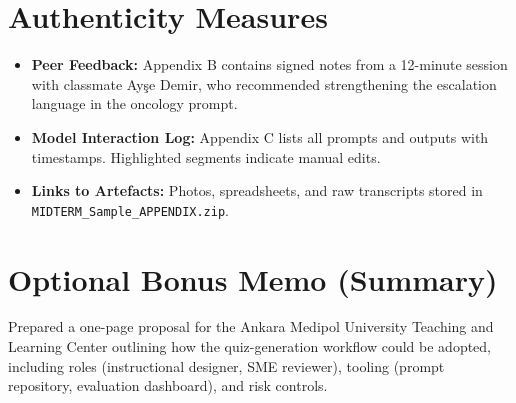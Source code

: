\documentclass[11pt]{article}
\begin{document}
\section{Authenticity Measures}
\begin{itemize}[leftmargin=*]
    \item \textbf{Peer Feedback:} Appendix B contains signed notes from a 12-minute session with classmate Ayşe Demir, who recommended strengthening the escalation language in the oncology prompt.
    \item \textbf{Model Interaction Log:} Appendix C lists all prompts and outputs with timestamps. Highlighted segments indicate manual edits.
    \item \textbf{Links to Artefacts:} Photos, spreadsheets, and raw transcripts stored in \texttt{MIDTERM\_Sample\_APPENDIX.zip}.
\end{itemize}

\section{Optional Bonus Memo (Summary)}
Prepared a one-page proposal for the Ankara Medipol University Teaching and Learning Center outlining how the quiz-generation workflow could be adopted, including roles (instructional designer, SME reviewer), tooling (prompt repository, evaluation dashboard), and risk controls.
\end{document}
